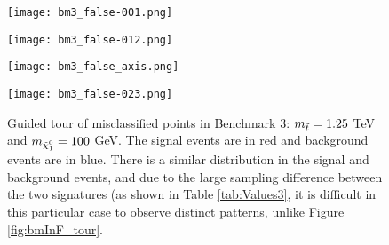 \begin{figure}[htbp]
\centering
  \begin{minipage}[htbp]{0.4\textwidth}
    \centering
    \texttt{[image: bm3\_false-001.png]}
  \end{minipage}
  \begin{minipage}[htbp]{0.4\textwidth}
    \centering
    \texttt{[image: bm3\_false-012.png]}
  \end{minipage}
  \begin{minipage}[htbp]{0.4\textwidth}
    \centering
    \texttt{[image: bm3\_false\_axis.png]}
  \end{minipage}
  \begin{minipage}[htbp]{0.4\textwidth}
    \centering
    \texttt{[image: bm3\_false-023.png]}
  \end{minipage}
  \caption{Guided tour of misclassified points in Benchmark 3: $m_{\Tilde{t}} = 1.25$ TeV and $m_{\Tilde{\chi}_1^0} = 100$ GeV. The signal events are in red and background events are in blue. There is a similar distribution in the signal and background events, and due to the large sampling difference between the two signatures (as shown in Table \ref{tab:Values3}, it is difficult in this particular case to observe distinct patterns, unlike Figure \ref{fig:bmInF_tour}.}
  \label{fig:bm3F_tour}
\end{figure}


